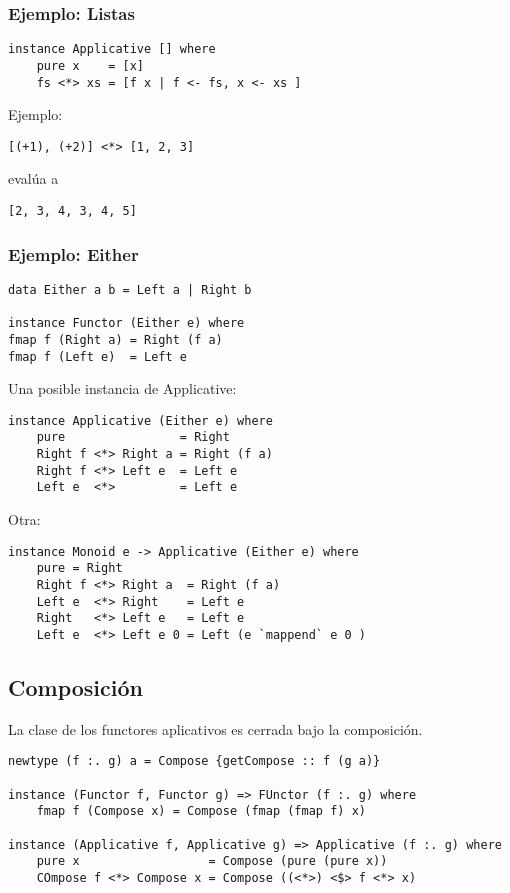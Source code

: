 \documentclass{article}
\begin{document}
\subsubsection{Ejemplo: Listas}

\begin{lstlisting}
instance Applicative [] where
    pure x    = [x]
    fs <*> xs = [f x | f <- fs, x <- xs ]
\end{lstlisting}

Ejemplo:
\begin{lstlisting}
[(+1), (+2)] <*> [1, 2, 3]
\end{lstlisting}
\indent \indent evalúa a
\begin{lstlisting}
[2, 3, 4, 3, 4, 5]
\end{lstlisting}

\subsubsection{Ejemplo: Either}

\begin{lstlisting}
data Either a b = Left a | Right b

instance Functor (Either e) where
fmap f (Right a) = Right (f a)
fmap f (Left e)  = Left e
\end{lstlisting}

Una posible instancia de Applicative:

\begin{lstlisting}
instance Applicative (Either e) where
    pure                = Right
    Right f <*> Right a = Right (f a)
    Right f <*> Left e  = Left e
    Left e  <*>         = Left e
\end{lstlisting}

Otra:

\begin{lstlisting}
instance Monoid e -> Applicative (Either e) where
    pure = Right
    Right f <*> Right a  = Right (f a)
    Left e  <*> Right    = Left e
    Right   <*> Left e   = Left e
    Left e  <*> Left e 0 = Left (e `mappend` e 0 )
\end{lstlisting}

\subsection{Composición}

La clase de los functores aplicativos es cerrada bajo la composición.

\begin{lstlisting}
newtype (f :. g) a = Compose {getCompose :: f (g a)}

instance (Functor f, Functor g) => FUnctor (f :. g) where
    fmap f (Compose x) = Compose (fmap (fmap f) x)
    
instance (Applicative f, Applicative g) => Applicative (f :. g) where
    pure x                  = Compose (pure (pure x))
    COmpose f <*> Compose x = Compose ((<*>) <$> f <*> x)
\end{lstlisting}
\end{document}
